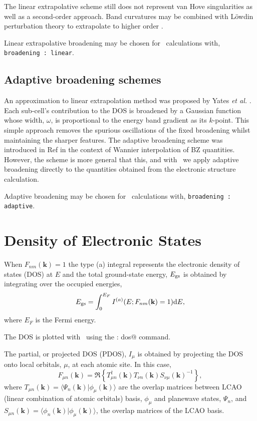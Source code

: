 \documentclass[a4paper,11pt,twoside]{book}
\newcommand{\kbf}{\mathbf{k}}
\renewcommand{\d}{\mathrm{d}}
\begin{document}
The linear extrapolative scheme still does not represent van Hove singularities as well as a second-order approach.
%
Band curvatures may be combined with L\"owdin perturbation theory to extrapolate to higher order \cite{pickard:PRB:1999,pickard:PRB:2000}.

Linear extrapolative broadening may be chosen  for \optados\ calculations with, \texttt{broadening : linear}.


\subsection{Adaptive broadening schemes}
An approximation to linear extrapolation method was proposed by Yates \emph{et al.} \cite{yates:PRB:2007}.
%
Each sub-cell's contribution to the DOS is broadened by a Gaussian function whose width, $\omega$, is proportional to the energy band gradient as its $k$-point.
%
This simple approach removes the spurious oscillations of the fixed broadening whilst maintaining the sharper features.
%
The adaptive broadening scheme was introduced in Ref \cite{yates:PRB:2007} in the context of Wannier interpolation of BZ quantities.
%
However, the scheme is more general that this, and with \optados\ we apply adaptive broadening directly to the quantities obtained from the electronic structure calculation.

Adaptive broadening may be chosen  for \optados\ calculations with, \texttt{broadening : adaptive}.



\section{Density of Electronic States}

When $F_{nm}(\kbf)=1$ the type (a) integral represents the electronic density of states (DOS) at $E$ and the total ground-state energy, $E_{\rm gs}$ is obtained by integrating over the occupied energies,
\begin{equation}
E_{\rm gs} = \int^{E_{F}}_0 I^{(a)}( E; F_{nm}(\kbf)=1) \d E,
\end{equation}
where $E_F$ is the Fermi energy.

The DOS is plotted with \optados\ using the \verb@task : dos@ command.

The partial, or projected DOS (PDOS), $I_{\mu}$ is obtained by projecting the DOS onto local orbitals, $\mu$, at each atomic site\cite{segall:MP:1996}.
%
In this case,
\begin{equation}
F_{\mu n}(\kbf)=\Re \left \{  T_{\mu n}^{\dagger}(\kbf) T_{\nu n}(\kbf) S_{\nu \mu}(\kbf)^{-1} \right \},
\end{equation}
where $ T_{\mu n}(\kbf)= \langle \Psi_n(\kbf)|\phi_{\mu}(\kbf)
\rangle$ are the overlap matrices between LCAO (linear combination of
atomic orbitals) basis, $\phi_{\mu}$ and planewave states, $\Psi_n$, and  $ S_{\mu n}(\kbf)=\langle \phi_n(\kbf)|\phi_{\mu}(\kbf) \rangle$, the overlap matrices of the LCAO basis.
\end{document}
